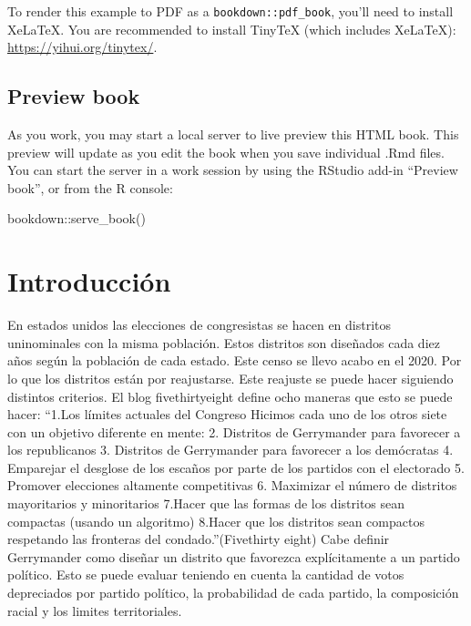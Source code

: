 \documentclass[
]{book}
\newenvironment{Shaded}{\begin{snugshade}}{\end{snugshade}}
\newcommand{\FunctionTok}[1]{\textcolor[rgb]{0.00,0.00,0.00}{#1}}
\newcommand{\NormalTok}[1]{#1}
\newcommand{\SpecialCharTok}[1]{\textcolor[rgb]{0.00,0.00,0.00}{#1}}
\begin{document}
To render this example to PDF as a \texttt{bookdown::pdf\_book}, you'll need to install XeLaTeX. You are recommended to install TinyTeX (which includes XeLaTeX): \url{https://yihui.org/tinytex/}.

\hypertarget{preview-book}{%
\section{Preview book}\label{preview-book}}

As you work, you may start a local server to live preview this HTML book. This preview will update as you edit the book when you save individual .Rmd files. You can start the server in a work session by using the RStudio add-in ``Preview book'', or from the R console:

\begin{Shaded}
\begin{Highlighting}[]
\NormalTok{bookdown}\SpecialCharTok{::}\FunctionTok{serve\_book}\NormalTok{()}
\end{Highlighting}
\end{Shaded}

\hypertarget{introducciuxf3n}{%
\chapter{Introducción}\label{introducciuxf3n}}

En estados unidos las elecciones de congresistas se hacen en distritos uninominales con la misma población. Estos distritos son diseñados cada diez años según la población de cada estado. Este censo se llevo acabo en el 2020. Por lo que los distritos están por reajustarse. Este reajuste se puede hacer siguiendo distintos criterios. El blog fivethirtyeight define ocho maneras que esto se puede hacer:
``1.Los límites actuales del Congreso
Hicimos cada uno de los otros siete con un objetivo diferente en mente:
2. Distritos de Gerrymander para favorecer a los republicanos
3. Distritos de Gerrymander para favorecer a los demócratas
4. Emparejar el desglose de los escaños por parte de los partidos con el electorado
5. Promover elecciones altamente competitivas
6. Maximizar el número de distritos mayoritarios y minoritarios
7.Hacer que las formas de los distritos sean compactas (usando un algoritmo)
8.Hacer que los distritos sean compactos respetando las fronteras del condado.''(Fivethirty eight)
Cabe definir Gerrymander como diseñar un distrito que favorezca explícitamente a un partido político. Esto se puede evaluar teniendo en cuenta la cantidad de votos depreciados por partido político, la probabilidad de cada partido, la composición racial y los limites territoriales.
\end{document}
